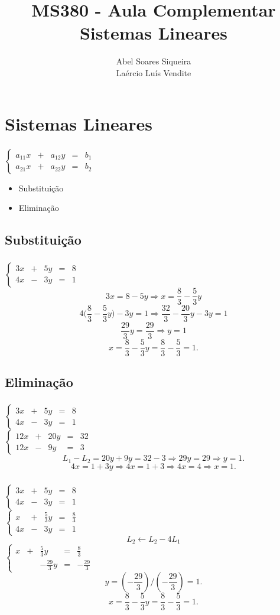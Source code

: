 \documentclass[10 pt]{beamer}
\title{ MS380 - Aula Complementar \\
Sistemas Lineares}
\author{Abel Soares Siqueira \\
Laércio Luís Vendite}
\date{}
\newcommand{\makesection}[1]{\section[#1]{#1}}
\newcommand{\makesubsection}[1]{\subsection[#1]{#1}}
\newcommand{\myframe}[1]{
\begin{frame}
 \frametitle{\insertsection \qquad {\small \insertsubsection}}
#1
\end{frame}}
\newcommand{\spc}{\vspace{0.5 cm}}
\newcommand{\systemtwo}[1]{$
  \left\{\begin{array}{rcrcr} #1
  \end{array}\right.$}
\begin{document}
\begin{frame}
 \titlepage
\end{frame}

\makesection{Sistemas Lineares}
\myframe {
\begin{center}
  \systemtwo{
    a_{11}x & + & a_{12}y & = & b_1 \\
    a_{21}x & + & a_{22}y & = & b_2
  }
  \spc
  \begin{itemize}
    \item Substituição
    \item Eliminação
  \end{itemize}
  \end{center}
}

\makesubsection{Substituição}
\myframe {
\begin{center}
  \systemtwo{
    3x & + & 5y & = & 8 \\
    4x & - & 3y & = & 1
  } \\
    \pause
    $$ 3x = 8 - 5y \Longrightarrow
    x  = \frac{8}{3} - \frac{5}{3}y $$
    \pause
    $$ 4\bigg(\frac{8}{3} - \frac{5}{3}y\bigg) - 3y = 1 
      \Longrightarrow \frac{32}{3} - \frac{20}{3}y - 3y = 1$$
    \pause
    $$ \frac{29}{3}y = \frac{29}{3} \Longrightarrow y = 1 $$
    \pause
    $$ x  = \frac{8}{3} - \frac{5}{3}y = 
      \frac{8}{3} - \frac{5}{3} = 1. $$
\end{center}
}

\makesubsection{Eliminação}
\myframe {
  \begin{center}
  \systemtwo{
    3x & + & 5y & = & 8 \\
    4x & - & 3y & = & 1
  } \spc \\
  \pause
  \systemtwo{
    12x & + & 20y & = & 32 \\
    12x & - & 9y & = & 3
  } \\
  \pause
  $$ L_1 - L_2 = 20y + 9y = 32 - 3 \Longrightarrow 29y = 29 
    \Longrightarrow y = 1.$$
  \pause
  $$ 4x = 1 + 3y \Longrightarrow 4x = 1 + 3 \Longrightarrow 
    4x = 4 \Longrightarrow x = 1. $$
  \end{center}
}

\myframe {
  \begin{center}
  \systemtwo{
    3x & + & 5y & = & 8 \\
    4x & - & 3y & = & 1
  } \spc \\
  \pause
  \systemtwo{
    x & + & \frac{5}{3}y & = & \frac{8}{3} \\
    4x & - & 3y & = & 1
  } \\
  \pause
  $$L_2 \leftarrow L_2 - 4L_1$$
  \pause
  \systemtwo{
    x & + & \frac{5}{3}y & = & \frac{8}{3} \\
      &  & -\frac{29}{3}y & = & -\frac{29}{3}
  } \\
  \pause
  $$ y = (-\frac{29}{3})/(-\frac{29}{3}) = 1. $$
  \pause
  $$ x = \frac{8}{3} - \frac{5}{3}y =
         \frac{8}{3} - \frac{5}{3} = 1. $$
  \end{center}
}
\end{document}
